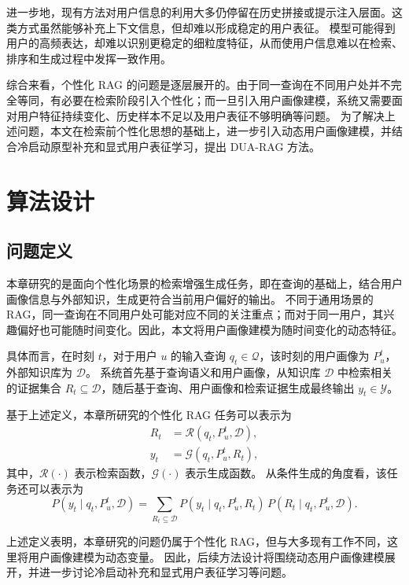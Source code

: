 进一步地，现有方法对用户信息的利用大多仍停留在历史拼接或提示注入层面。这类方式虽然能够补充上下文信息，但却难以形成稳定的用户表征。
模型可能得到用户的高频表达，却难以识别更稳定的细粒度特征，从而使用户信息难以在检索、排序和生成过程中发挥一致作用。

综合来看，个性化 RAG 的问题是逐层展开的。由于同一查询在不同用户处并不完全等同，有必要在检索阶段引入个性化；而一旦引入用户画像建模，系统又需要面对用户特征持续变化、历史样本不足以及用户表征不够明确等问题。
为了解决上述问题，本文在检索前个性化思想的基础上，进一步引入动态用户画像建模，并结合冷启动原型补充和显式用户表征学习，提出 DUA-RAG 方法。

\section{算法设计}
\subsection{问题定义}

本章研究的是面向个性化场景的检索增强生成任务，即在查询的基础上，结合用户画像信息与外部知识，生成更符合当前用户偏好的输出。
不同于通用场景的 RAG，同一查询在不同用户处可能对应不同的关注重点；而对于同一用户，其兴趣偏好也可能随时间变化。因此，本文将用户画像建模为随时间变化的动态特征。

具体而言，在时刻 $t$，对于用户 $u$ 的输入查询 $q_t \in \mathcal{Q}$，该时刻的用户画像为 $P_u^t$，外部知识库为 $\mathcal{D}$。
系统首先基于查询语义和用户画像，从知识库 $\mathcal{D}$ 中检索相关的证据集合 $R_t \subseteq \mathcal{D}$，随后基于查询、用户画像和检索证据生成最终输出 $y_t \in \mathcal{Y}$。

基于上述定义，本章所研究的个性化 RAG 任务可以表示为
\begin{align}
R_t&=\mathcal{R}(q_t,P_u^t,\mathcal{D}),
\\
y_t&=\mathcal{G}(q_t,P_u^t,R_t),
\end{align}
其中，$\mathcal{R}(\cdot)$ 表示检索函数，$\mathcal{G}(\cdot)$ 表示生成函数。
从条件生成的角度看，该任务还可以表示为
\begin{equation}
P(y_t \mid q_t,P_u^t,\mathcal{D})
=\sum_{R_t \subseteq \mathcal{D}} P(y_t \mid q_t,P_u^t,R_t)\,P(R_t \mid q_t,P_u^t,\mathcal{D}).
\end{equation}

上述定义表明，本章研究的问题仍属于个性化 RAG，但与大多现有工作不同，这里将用户画像建模为动态变量。
因此，后续方法设计将围绕动态用户画像建模展开，并进一步讨论冷启动补充和显式用户表征学习等问题。

